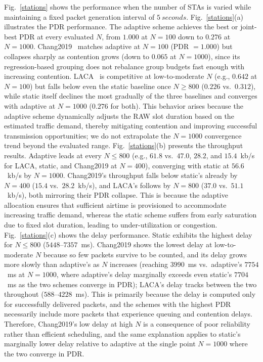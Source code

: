 \documentclass[journal]{IEEEtran}
\newcommand{\new}[1]{{\color{red}#1}}
\begin{document}
Fig.~\ref{stations} shows the performance when the number of STAs is varied while maintaining a fixed packet generation interval of $5\ seconds$. Fig.~\ref{stations}(a) illustrates the PDR performance. \new{The adaptive scheme achieves the best or joint-best PDR at every evaluated $N$, from $1.000$ at $N=100$ down to $0.276$ at $N=1000$. Chang2019~\cite{Chang2019TrafficAware} matches adaptive at $N=100$ (PDR $=1.000$) but collapses sharply as contention grows (down to $0.065$ at $N=1000$), since its regression-based grouping does not rebalance group budgets fast enough with increasing contention. LACA~\cite{10067238} is competitive at low-to-moderate $N$ (e.g., $0.642$ at $N=100$) but falls below even the static baseline once $N\ge800$ ($0.226$ vs.\ $0.312$), while static itself declines the most gradually of the three baselines and converges with adaptive at $N=1000$ ($0.276$ for both).} This behavior arises because the adaptive scheme dynamically adjusts the RAW slot duration based on the estimated traffic demand, thereby mitigating contention and improving successful transmission opportunities\new{; we do not extrapolate the $N=1000$ convergence trend beyond the evaluated range}. Fig.~\ref{stations}(b) presents the throughput results. \new{Adaptive leads at every $N\le800$ (e.g., $61.8$ vs.\ $47.0$, $28.2$, and $15.4$~kb/s for LACA, static, and Chang2019 at $N=400$), converging with static at $56.6$~kb/s by $N=1000$. Chang2019's throughput falls below static's already by $N=400$ ($15.4$ vs.\ $28.2$~kb/s), and LACA's follows by $N=800$ ($37.0$ vs.\ $51.1$~kb/s), both mirroring their PDR collapse.} This is because the adaptive allocation ensures that sufficient airtime is provisioned to accommodate increasing traffic demand, whereas the static scheme suffers from early saturation due to fixed slot duration, leading to under-utilization or congestion. Fig.~\ref{stations}(c) shows the delay performance. \new{Static exhibits the highest delay for $N\le800$ ($5448$--$7357$~ms). Chang2019 shows the lowest delay at low-to-moderate $N$ because so few packets survive to be counted, and its delay grows more slowly than adaptive's as $N$ increases (reaching $3990$~ms vs.\ adaptive's $7754$~ms at $N=1000$, where adaptive's delay marginally exceeds even static's $7704$~ms as the two schemes converge in PDR); LACA's delay tracks between the two throughout ($588$--$4228$~ms).} This is primarily because the delay is computed only for successfully delivered packets, and the schemes with the highest PDR necessarily include more packets that experience queuing and contention delays. \new{Therefore, Chang2019's low delay at high $N$ is a consequence of poor reliability rather than efficient scheduling, and the same explanation applies to static's marginally lower delay relative to adaptive at the single point $N=1000$ where the two converge in PDR.}
\end{document}
